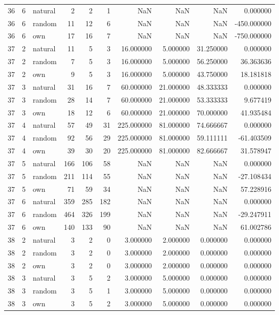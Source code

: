 \begin{table}[htbp]
\begin{tabular}{rrlrrrrrrr}
36 & 6 & natural & 2 & 2 & 1 & NaN & NaN & NaN & 0.000000 \\
36 & 6 & random & 11 & 12 & 6 & NaN & NaN & NaN & -450.000000 \\
36 & 6 & own & 17 & 16 & 7 & NaN & NaN & NaN & -750.000000 \\
37 & 2 & natural & 11 & 5 & 3 & 16.000000 & 5.000000 & 31.250000 & 0.000000 \\
37 & 2 & random & 7 & 5 & 3 & 16.000000 & 5.000000 & 56.250000 & 36.363636 \\
37 & 2 & own & 9 & 5 & 3 & 16.000000 & 5.000000 & 43.750000 & 18.181818 \\
37 & 3 & natural & 31 & 16 & 7 & 60.000000 & 21.000000 & 48.333333 & 0.000000 \\
37 & 3 & random & 28 & 14 & 7 & 60.000000 & 21.000000 & 53.333333 & 9.677419 \\
37 & 3 & own & 18 & 12 & 6 & 60.000000 & 21.000000 & 70.000000 & 41.935484 \\
37 & 4 & natural & 57 & 49 & 31 & 225.000000 & 81.000000 & 74.666667 & 0.000000 \\
37 & 4 & random & 92 & 56 & 29 & 225.000000 & 81.000000 & 59.111111 & -61.403509 \\
37 & 4 & own & 39 & 30 & 20 & 225.000000 & 81.000000 & 82.666667 & 31.578947 \\
37 & 5 & natural & 166 & 106 & 58 & NaN & NaN & NaN & 0.000000 \\
37 & 5 & random & 211 & 114 & 55 & NaN & NaN & NaN & -27.108434 \\
37 & 5 & own & 71 & 59 & 34 & NaN & NaN & NaN & 57.228916 \\
37 & 6 & natural & 359 & 285 & 182 & NaN & NaN & NaN & 0.000000 \\
37 & 6 & random & 464 & 326 & 199 & NaN & NaN & NaN & -29.247911 \\
37 & 6 & own & 140 & 133 & 90 & NaN & NaN & NaN & 61.002786 \\
38 & 2 & natural & 3 & 2 & 0 & 3.000000 & 2.000000 & 0.000000 & 0.000000 \\
38 & 2 & random & 3 & 2 & 0 & 3.000000 & 2.000000 & 0.000000 & 0.000000 \\
38 & 2 & own & 3 & 2 & 0 & 3.000000 & 2.000000 & 0.000000 & 0.000000 \\
38 & 3 & natural & 3 & 5 & 2 & 3.000000 & 5.000000 & 0.000000 & 0.000000 \\
38 & 3 & random & 3 & 5 & 1 & 3.000000 & 5.000000 & 0.000000 & 0.000000 \\
38 & 3 & own & 3 & 5 & 2 & 3.000000 & 5.000000 & 0.000000 & 0.000000 \\

\end{tabular}
\end{table}
